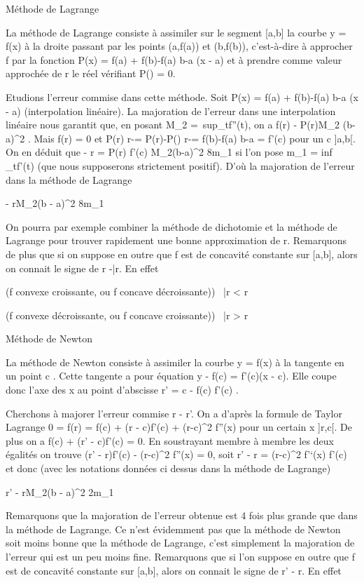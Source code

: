 \documentclass[]{article}
\begin{document}
Méthode de Lagrange

La méthode de Lagrange consiste à assimiler sur le segment [a,b] la
courbe y = f(x) à la droite passant par les points (a,f(a)) et (b,f(b)),
c'est-à-dire à approcher f par la fonction P(x) = f(a) + f(b)-f(a)
\over b-a (x - a) et à prendre comme valeur approchée
de r le réel \barr vérifiant
P(\barr) = 0.

Etudions l'erreur commise dans cette méthode. Soit P(x) = f(a) +
f(b)-f(a) \over b-a (x - a) (interpolation linéaire).
La majoration de l'erreur dans une interpolation linéaire nous garantit
que, en posant M_2 =\
sup_t\in[a,b]f''(t), on a f(r)
- P(r)\leq M_2 (b-a)^2  . Mais f(r) = 0 et  P(r) \over
r-\barr = P(r)-P(\barr)
\over r-\barr = f(b)-f(a)
\over b-a = f'(c) pour un c \in]a,b[. On en déduit
que \barr - r =
\left  P(r) \over f'(c)
\right \leq M_2(b-a)^2
\over 8m_1 si l'on pose m_1
= inf~
_t\in[a,b]f'(t) (que nous supposerons
strictement positif). D'où la majoration de l'erreur dans la méthode de
Lagrange

\barr - r\leq M_2(b -
a)^2 \over 8m_1

On pourra par exemple combiner la méthode de dichotomie et la méthode de
Lagrange pour trouver rapidement une bonne approximation de r.
Remarquons de plus que si on suppose en outre que f est de concavité
constante sur [a,b], alors on connait le signe de r
-\bar r. En effet

(f convexe croissante, ou f concave décroissante))
\rigtharrow~\bar r < r

(f convexe décroissante, ou f concave croissante))
\rigtharrow~\bar r > r

Méthode de Newton

La méthode de Newton consiste à assimiler la courbe y = f(x) à la
tangente en un point c \in [a,b]. Cette tangente a pour équation y -
f(c) = f'(c)(x - c). Elle coupe donc l'axe des x au point d'abscisse r'
= c - f(c) \over f'(c) .

Cherchons à majorer l'erreur commise r - r'. On a
d'après la formule de Taylor Lagrange 0 = f(r) = f(c) + (r - c)f'(c) +
(r-c)^2 \over 2 f''(x) pour un certain x
\in]r,c[. De plus on a f(c) + (r' - c)f'(c) = 0. En soustrayant membre
à membre les deux égalités on trouve (r' - r)f'(c) -
(r-c)^2  f''(x) = 0, soit r' - r =
(r-c)^2 \over 2  f'`(x)
\over f'(c) et donc (avec les notations données ci
dessus dans la méthode de Lagrange)

r' - r\leq M_2(b - a)^2
\over 2m_1

Remarquons que la majoration de l'erreur obtenue est 4 fois plus grande
que dans la méthode de Lagrange. Ce n'est évidemment pas que la méthode
de Newton soit moins bonne que la méthode de Lagrange, c'est simplement
la majoration de l'erreur qui est un peu moins fine. Remarquons que si
l'on suppose en outre que f est de concavité constante sur [a,b],
alors on connait le signe de r' - r. En effet
\end{document}

